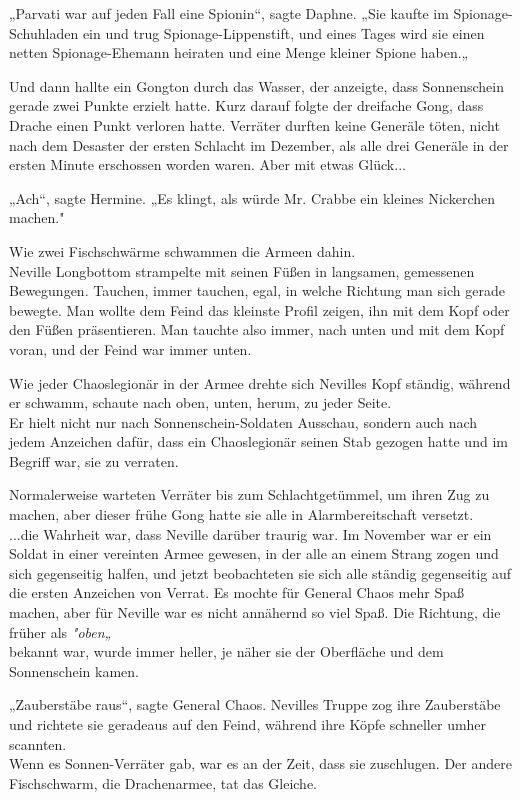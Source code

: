 {„Parvati war auf jeden Fall eine Spionin“, sagte Daphne. „Sie kaufte im Spionage-Schuhladen ein und trug Spionage-Lippenstift, und eines Tages wird sie einen netten Spionage-Ehemann heiraten und eine Menge kleiner Spione haben.„

Und dann hallte ein Gongton durch das Wasser, der anzeigte, dass Sonnenschein gerade zwei Punkte erzielt hatte. Kurz darauf folgte der dreifache Gong, dass Drache einen Punkt verloren hatte. Verräter durften keine Generäle töten, nicht nach dem Desaster der ersten Schlacht im Dezember, als alle drei Generäle in der ersten Minute erschossen worden waren. Aber mit etwas Glück...

„Ach“, sagte Hermine. „Es klingt, als würde Mr. Crabbe ein kleines Nickerchen machen."

Wie zwei Fischschwärme schwammen die Armeen dahin.\\ Neville Longbottom strampelte mit seinen Füßen in langsamen, gemessenen Bewegungen. Tauchen, immer tauchen, egal, in welche Richtung man sich gerade bewegte. Man wollte dem Feind das kleinste Profil zeigen, ihn mit dem Kopf oder den Füßen präsentieren. Man tauchte also immer, nach unten und mit dem Kopf voran, und der Feind war immer unten.

Wie jeder Chaoslegionär in der Armee drehte sich Nevilles Kopf ständig, während er schwamm, schaute nach oben, unten, herum, zu jeder Seite.\\ Er hielt nicht nur nach Sonnenschein-Soldaten Ausschau, sondern auch nach jedem Anzeichen dafür, dass ein Chaoslegionär seinen Stab gezogen hatte und im Begriff war, sie zu verraten.

Normalerweise warteten Verräter bis zum Schlachtgetümmel, um ihren Zug zu machen, aber dieser frühe Gong hatte sie alle in Alarmbereitschaft versetzt.\\ ...die Wahrheit war, dass Neville darüber traurig war. Im November war er ein Soldat in einer vereinten Armee gewesen, in der alle an einem Strang zogen und sich gegenseitig halfen, und jetzt beobachteten sie sich alle ständig gegenseitig auf die ersten Anzeichen von Verrat. Es mochte für General Chaos mehr Spaß machen, aber für Neville war es nicht annähernd so viel Spaß. Die Richtung, die früher als \emph{"oben„}\\ bekannt war, wurde immer heller, je näher sie der Oberfläche und dem Sonnenschein kamen.

„Zauberstäbe raus“, sagte General Chaos. Nevilles Truppe zog ihre Zauberstäbe und richtete sie geradeaus auf den Feind, während ihre Köpfe schneller umher scannten.\\ Wenn es Sonnen-Verräter gab, war es an der Zeit, dass sie zuschlugen. Der andere Fischschwarm, die Drachenarmee, tat das Gleiche.

}
